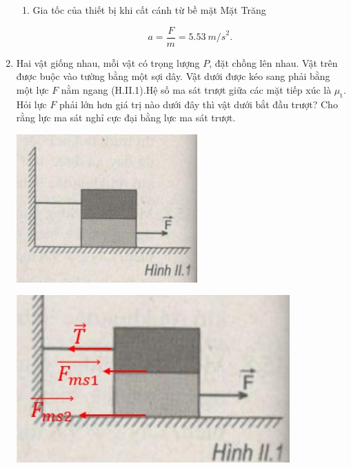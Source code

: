 \begin{enumerate}[label=\bfseries Câu \arabic*:]
{\begin{enumerate}[label=\alph*)]
			- Lực hấp dẫn của Mặt Trăng tác dụng lên thiết bị: $P = \SI{112}{N}.$
			
			Hai lực này cùng phương, ngược chiều.
			
			- Tổng hợp lực nâng của động cơ và lực hấp dẫn của Mặt Trăng tác dụng lên thiết bị là:
			
			$$F = F_\text{n} - P = \SI{388}{N}.$$
			
			\item Gia tốc của thiết bị khi cất cánh từ bề mặt Mặt Trăng
			
			$$a = \dfrac{F}{m} = \SI{5,53}{m/s}^2.$$
			
		\end{enumerate}
	}
	\item {}
	
	
	{
		Hai vật giống nhau, mỗi vật có trọng lượng $P$, đặt chồng lên nhau. Vật trên được buộc vào tường bằng một sợi dây. Vật dưới được kéo sang phải bằng một lực $F$ nằm ngang (H.II.1).Hệ số ma sát trượt giữa các mặt tiếp xúc là $\mu_\text{t}$. Hỏi lực $F$ phải lớn hơn giá trị nào dưới đây thì vật dưới bắt đầu trượt? Cho rằng lực ma sát nghỉ cực đại bằng lực ma sát trượt.
		
		\begin{center}
			\includegraphics[scale=0.8]{../figs/VN10-2022-PH-TP021-15.jpg}
		\end{center}
	
	}
	
	\hideall
	{
		\begin{center}
			\includegraphics[scale=0.6]{../figs/VN10-2022-PH-TP021-16.jpg}
		\end{center}
	
}
\end{enumerate}
